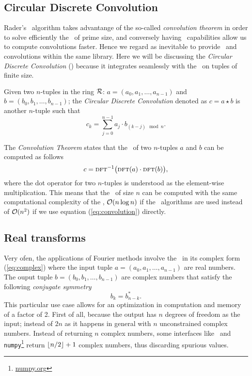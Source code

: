 \subsection{Circular Discrete Convolution}
Rader's \fft\ algorithm takes advantange of the so-called
\emph{convolution theorem} in order to solve efficiently the \dft\ of prime size, 
and conversely having \fft\ capabilities allow
us to compute convolutions faster. Hence we regard as
inevitable to provide \dft\ and convolutions within the same library.
Here we will be discussing the \emph{Circular Discrete Convolution} (\cdc)
because it integrates seamlessly with the \dft\ on tuples of finite size.
\begin{definition}
    Given two $n$-tuples in the ring $\mathcal{R}$: 
    $a = (a_0,a_1,\ldots,a_{n-1})$ and $b=(b_0,b_1,\ldots,b_{n-1})$;
    the \emph{Circular Discrete Convolution} denoted as 
    $c = a\star b$ is another
    $n$-tuple such that
    \begin{equation} 
        c_k = \sum_{j=0}^{n-1} a_j \cdot b_{(k-j) \mod n}.
        \label{eq:convolution}
    \end{equation}
    \label{def:convolution}
\end{definition}
The \emph{Convolution Theorem} states that the \cdc\ of two $n$-tuples $a$ and
$b$ can be computed as follows
\begin{equation}
    c = \textsc{dft}^{-1}\big( \textsc{dft}(a) \cdot \textsc{dft}(b)  \big),
    \label{eq:conv_theorem}
\end{equation}
where the dot operator for two $n$-tuples is understood as the element-wise
multiplication. This means that the \cdc\ of size $n$ can be computed with the
same computational complexity of the \dft, $\mathcal{O}(n\log n)$ if the \fft\
algorithms are used instead of $\mathcal{O}(n^2)$ if we use equation
(\ref{eq:convolution}) directly.

\subsection{Real transforms}\label{subsec:real}
Very ofen, the applications of Fourier methods involve the \dft\ in its complex
form (\ref{eq:complex}) where the input tuple $a = (a_0,a_1,\ldots,a_{n-1})$ are
real numbers.
The ouput tuple $b = (b_0,b_1,\ldots,b_{n-1})$ are complex numbers that satisfy
the following \emph{conjugate symmetry} 
\begin{equation}
    b_{k} = b^*_{n-k}.
    \label{eq:rfft_sym}
\end{equation}
This particular use case allows for an optimization in computation and memory of
a factor of 2. First of all, because the output has $n$ degrees of freedom as
the input; instead of $2n$ as it happens in general with $n$ unconstrained
complex numbers. Instead of returning $n$ complex numbers, some interfaces like
\fftw\ and \texttt{numpy}\footnote{\url{numpy.org}} return $\lfloor n/2 \rfloor+1$
complex numbers, thus discarding spurious values.

